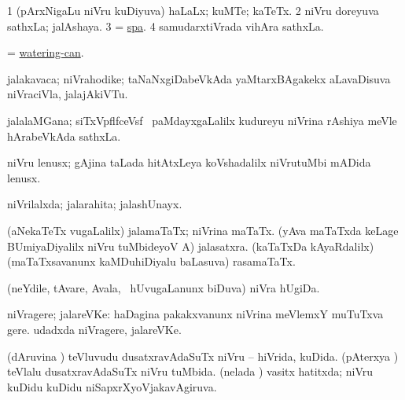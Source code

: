 \bentry
{} 
\gl{\nA}
\expl{}
\bmng
\bnum
\num{1} (pArxNigaLu niVru kuDiyuva) haLaLx; kuMTe; kaTeTx. 
\num{2} niVru doreyuva sathxLa; jalAshaya. 
\num{3} = \hyperref{kandict_s.pdf}{S}{spa}{spa}. 
\num{4} samudarxtiVrada vihAra sathxLa. 
\enum
\emng
\eentry

\bentry
{} 
\gl{\nA}
\expl{}
\bmng
= \hyperlink{wateringcan}{watering-can}. 
\emng
\eentry

\bentry
{} 
\gl{\nA}
\expl{}
\bmng
jalakavaca; niVrahodike; taNaNxgiDabeVkAda yaMtarxBAgakekx aLavaDisuva niVraciVla, jalajAkiVTu. 
\emng
\eentry

\bentry
{} 
\gl{\nA}
\expl{}
\bmng
jalalaMGana; siTxVpflfceVsf \mo\ paMdayxgaLalilx kudureyu niVrina rAshiya meVle hArabeVkAda sathxLa. 
\emng
\eentry

\bentry
{} 
\gl{\nA}
\expl{}
\bmng
niVru lenusx; gAjina taLada hitAtxLeya koVshadalilx niVrutuMbi mADida lenusx. 
\emng
\eentry

\bentry
{} 
\gl{\gu}
\expl{}
\bmng
niVrilalxda; jalarahita; jalashUnayx. 
\emng
\eentry

\bentry
{} 
\gl{\nA}
\expl{}
\bmng
\banum
{} (aNekaTeTx \mo vugaLalilx) jalamaTaTx; niVrina maTaTx. 
 (yAva maTaTxda keLage BUmiyaDiyalilx niVru tuMbideyoV A) jalasatxra. 
 (kaTaTxDa kAyaRdalilx) (maTaTxsavanunx kaMDuhiDiyalu baLasuva) rasamaTaTx. 
\eanum
\emng
\eentry

\bentry
{} 
\gl{\nA}
\expl{}
\bmng
(neYdile, tAvare, Avala, \mo\ hUvugaLanunx biDuva) niVra hUgiDa.  
\emng
\eentry

\bentry
{} 
\gl{\nA}
\expl{}
\bmng
niVragere; jalareVKe: 
\banum
{} haDagina pakakxvanunx niVrina meVlemxY muTuTxva gere. 
 udadxda niVragere, jalareVKe. 
\eanum
\emng
\eentry

\bentry
{} 
\gl{\gu}
\expl{}
\bmng
\banum
{} (dAruvina \vi) teVluvudu dusatxravAdaSuTx niVru -- hiVrida, kuDida. 
 (pAterxya \vi) teVlalu dusatxravAdaSuTx niVru tuMbida. 
 (nelada \vi) vasitx hatitxda; niVru kuDidu kuDidu niSapxrXyoVjakavAgiruva. 
\eanum
\emng
\eentry


